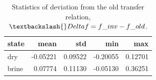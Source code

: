 \begin{table}[ht!]
\centering
\caption{Statistics of deviation from the old transfer relation, $\textbackslash{}Delta f = f\_{inv} - f\_{old}$.}
\label{tab:la\_delta\_f\_stats}
\begin{tabular}{lrrrr}
\toprule
\textbf{state} & \textbf{mean} & \textbf{std} & \textbf{min} & \textbf{max} \\
\midrule
dry & -0.05221 & 0.09522 & -0.20055 & 0.12701 \\
brine & 0.07774 & 0.11130 & -0.05130 & 0.36251 \\
\bottomrule
\end{tabular}
\end{table}
